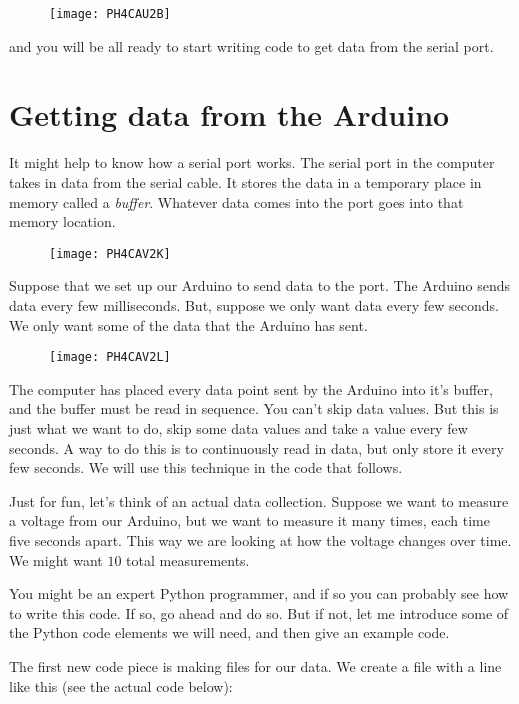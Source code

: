 \begin{figure}[h!]
	\centering
	\texttt{[image: PH4CAU2B]}
\end{figure}

and you will be all ready to start writing code to get data from the serial port.


\section{Getting data from the Arduino}

It might help to know how a serial port works. The serial port in the computer takes in data from the serial cable. It stores the data in a temporary place in memory called a \emph{buffer}. Whatever data comes into the port goes into that memory location.

\begin{figure}[h!]
	\texttt{[image: PH4CAV2K]}
\end{figure}

Suppose that we set up our Arduino to send data to the port. The Arduino sends data every few milliseconds. But, suppose we only want data every few seconds. We only want some of the data that the Arduino has sent. 

\begin{figure}[h!]
	\texttt{[image: PH4CAV2L]}
\end{figure}

The computer has placed every data point sent by the Arduino into it's buffer, and the buffer must be read in sequence. You can't skip data values. But this is just what we want to do, skip some data values and take a value every few seconds. A way to do this is to continuously read in data, but only store it every few seconds. We will use this technique in the code that follows.

Just for fun, let's think of an actual data collection. Suppose we want to measure a voltage from our Arduino, but we want to measure it many times, each time five seconds apart. This way we are looking at how the voltage changes over time. We might want $10$ total measurements.

You might be an expert Python programmer, and if so you can probably see how to write this code. If so, go ahead and do so. But if not, let me introduce some of the Python code elements we will need, and then give an example code. 

The first new code piece is making files for our data. We create a file with a line like this (see the actual code below):
\vspace{.1in}

